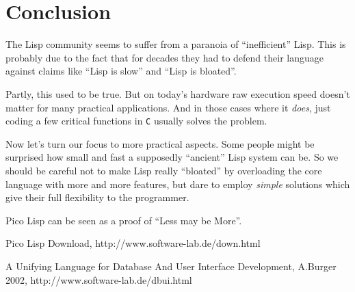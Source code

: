 \section{Conclusion}
\label{sec:rad-conclusion}

The Lisp community seems to suffer from a paranoia of ``inefficient'' Lisp. This
is probably due to the fact that for decades they had to defend their language
against claims like ``Lisp is slow'' and ``Lisp is bloated''.

Partly, this used to be true. But on today's hardware raw execution speed
doesn't matter for many practical applications. And in those cases where it
\emph{does}, just coding a few critical functions in \texttt{C} usually solves
the problem.

Now let's turn our focus to more practical aspects. Some people might be
surprised how small and fast a supposedly ``ancient'' Lisp system can be. So we
should be careful not to make Lisp really ``bloated'' by overloading the core
language with more and more features, but dare to employ \emph{simple} solutions
which give their full flexibility to the programmer.

Pico Lisp can be seen as a proof of ``Less may be More''.



\begin{thebibliography}{[9]}

 Pico Lisp Download, http://www.software-lab.de/down.html

 A Unifying Language for Database And User Interface Development,
A.Burger 2002, http://www.software-lab.de/dbui.html

\end{thebibliography}

